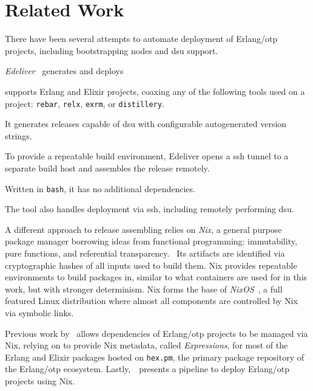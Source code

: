 \cleardoublepage
\section{Related Work}\label{sec:related_work}

There have been several attempts to automate deployment of Erlang/\acrshort{otp} projects, including bootstrapping nodes and \acrshort{dsu} support.

\emph{Edeliver}~\cite{edeliver,talk:edeliver} generates and deploys


supports Erlang and Elixir projects, coaxing any of the following tools used on a project: \lstinline|rebar|, \lstinline|relx|, \lstinline|exrm|, or \lstinline|distillery|.

It generates releases capable of \acrshort{dsu} with configurable autogenerated version strings.

To provide a repeatable build environment, Edeliver opens a \acrfull{ssh} tunnel to a separate build host and assembles the release remotely.

Written in \lstinline|bash|, it has no additional dependencies.

The tool also handles deployment via \acrshort{ssh}, including remotely performing \acrshort{dsu}.

A different approach to release assembling relies on \emph{Nix}, a general purpose package manager borrowing ideas from functional programming: immutability, pure functions, and referential transparency.~\cite{nix1} Its artifacts are identified via cryptographic hashes of all inputs used to build them. Nix provides repeatable environments to build packages in, similar to what containers are used for in this work, but with stronger determinism. Nix forms the base of \emph{NixOS}~\cite{nixos}, a full featured Linux distribution where almost all components are controlled by Nix via symbolic links.

Previous work by~\cite{erlangnix} allows dependencies of Erlang/\acrshort{otp} projects to be managed via Nix, relying on \cite{hex2nix} to provide Nix metadata, called \emph{Expressions}, for most of the Erlang and Elixir packages hosted on \lstinline|hex.pm|, the primary package repository of the Erlang/\acrshort{otp} ecosystem. Lastly,~\cite{erlangnix2}~presents a pipeline to deploy Erlang/\acrshort{otp} projects using Nix.
